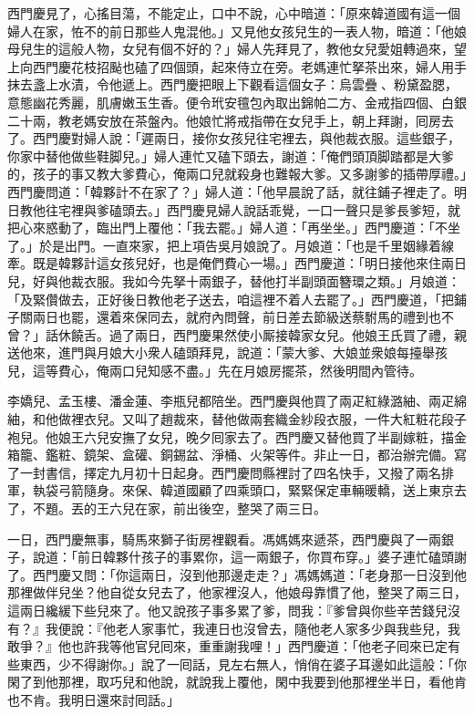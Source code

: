 西門慶見了，心搖目蕩，不能定止，口中不說，心中暗道：「原來韓道國有這一個婦人在家，恠不的前日那些人鬼混他。」{}又見他女孩兒生的一表人物，暗道：「他娘母兒生的這般人物，女兒有個不好的？」婦人先拜見了，教他女兒愛姐轉過來，望上向西門慶花枝招颭也磕了四個頭，起來侍立在旁。老媽連忙拏茶出來，婦人用手抹去盞上水漬，令他遞上。西門慶把眼上下觀看這個女子：烏雲疊𩬆、粉黛盈腮，意態幽花秀麗，肌膚嫩玉生香。便令玳安氊包內取出錦帕二方、金戒指四個、白銀二十兩，教老媽安放在茶盤內。他娘忙將戒指帶在女兒手上，朝上拜謝，囘房去了。西門慶對婦人說：「遲兩日，接你女孩兒往宅裡去，與他裁衣服。這些銀子，你家中替他做些鞋脚兒。」婦人連忙又磕下頭去，謝道：「俺們頭頂脚踏都是大爹的，孩子的事又教大爹費心，俺兩口兒就殺身也難報大爹。{}又多謝爹的插帶厚禮。」西門慶問道：「韓夥計不在家了？」婦人道：「他早晨說了話，就往鋪子裡走了。明日教他往宅裡與爹磕頭去。」西門慶見婦人說話乖覺，一口一聲只是爹長爹短，就把心來惑動了，臨出門上覆他：「我去罷。」婦人道：「再坐坐。」西門慶道：「不坐了。」{}於是出門。一直來家，把上項告吳月娘說了。月娘道：「也是千里姻緣着線牽。既是韓夥計這女孩兒好，也是俺們費心一場。」西門慶道：「明日接他來住兩日兒，好與他裁衣服。我如今先拏十兩銀子，替他打半副頭面簪環之類。」月娘道：「及緊儹做去，正好後日教他老子送去，咱這裡不着人去罷了。」西門慶道，「把鋪子關兩日也罷，還着來保同去，就府內問聲，前日差去節級送蔡駙馬的禮到也不曾？」話休饒舌。過了兩日，西門慶果然使小厮接韓家女兒。他娘王氏買了禮，親送他來，進門與月娘大小衆人磕頭拜見，說道：「蒙大爹、大娘並衆娘每擡舉孩兒，這等費心，俺兩口兒知感不盡。」先在月娘房擺茶，然後明間內管待。

李嬌兒、孟玉樓、潘金蓮、李瓶兒都陪坐。西門慶與他買了兩疋紅綠潞紬、兩疋綿紬，和他做裡衣兒。又叫了趙裁來，替他做兩套織金紗段衣服，一件大紅粧花段子袍兒。他娘王六兒安撫了女兒，晚夕囘家去了。西門慶又替他買了半副嫁粧，描金箱籠、鑑粧、鏡架、盒礶、銅錫盆、淨桶、火架等件。非止一日，都治辦完備。寫了一封書信，擇定九月初十日起身。西門慶問縣裡討了四名快手，又撥了兩名排軍，執袋弓箭隨身。來保、韓道國顧了四乘頭口，緊緊保定車輛暖轎，送上東京去了，不題。丟的王六兒在家，前出後空，整哭了兩三日。

一日，西門慶無事，騎馬來獅子街房裡觀看。馮媽媽來遞茶，西門慶與了一兩銀子，說道：「前日韓夥什孩子的事累你，這一兩銀子，你買布穿。」婆子連忙磕頭謝了。西門慶又問：「你這兩日，沒到他那邊走走？」馮媽媽道：「老身那一日沒到他那裡做伴兒坐？他自從女兒去了，他家裡沒人，他娘母靠慣了他，整哭了兩三日，這兩日纔緩下些兒來了。他又說孩子事多累了爹，問我：『爹曾與你些辛苦錢兒沒有？』我便說：『他老人家事忙，我連日也沒曾去，隨他老人家多少與我些兒，我敢爭？』他也許我等他官兒囘來，重重謝我哩！」西門慶道：「他老子囘來已定有些東西，少不得謝你。」說了一囘話，見左右無人，悄俏在婆子耳邊如此這般：「你閑了到他那裡，取巧兒和他說，就說我上覆他，閑中我要到他那裡坐半日，看他肯也不肯。我明日還來討囘話。」

